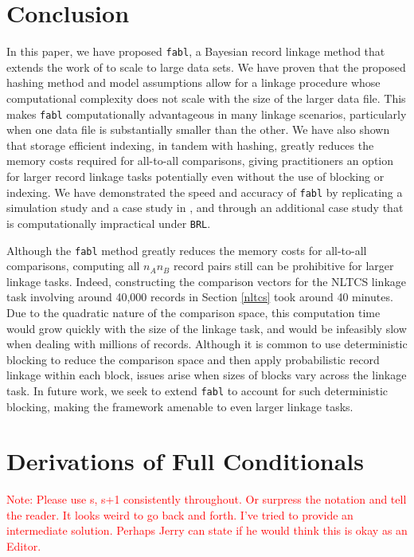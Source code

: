 \documentclass[ba]{imsart}
\begin{document}
	
	\section{Conclusion}
	\label{discussion}
	
	In this paper, we have proposed \texttt{fabl}, a Bayesian record linkage method that extends the work of \cite{sadinle_bayesian_2017} to scale to large data sets. We have proven that the proposed hashing method and model assumptions allow for a linkage procedure whose computational complexity does not scale with the size of the larger data file. This makes \texttt{fabl} computationally advantageous in many linkage scenarios, particularly when one data file is substantially smaller than the other. We have also shown that storage efficient indexing, in tandem with hashing, greatly reduces the memory costs required for all-to-all comparisons, giving practitioners an option for larger record linkage tasks potentially even without the use of blocking or indexing. We have demonstrated the speed and accuracy of \texttt{fabl} by replicating a simulation study and a case study in \cite{sadinle_bayesian_2017}, and through an additional case study that is computationally impractical under \texttt{BRL}. 
	
	Although the \texttt{fabl} method greatly reduces the memory costs for all-to-all comparisons, computing all $n_A  n_B$ record pairs still can be prohibitive for larger linkage tasks. Indeed, constructing the comparison vectors for the NLTCS linkage task involving around 40,000 records in Section \ref{nltcs} took around 40 minutes. Due to the quadratic nature of the comparison space, this computation time would grow quickly with the size of the linkage task, and would be infeasibly slow when dealing with millions of records. Although it is common to use deterministic blocking to reduce the comparison space and then apply probabilistic record linkage within each block, issues arise when sizes of blocks vary across the linkage task. In future work, we seek to extend \texttt{fabl} to account for such deterministic blocking, making the framework amenable to even larger linkage tasks.

	
	\clearpage
	
	\bigskip
	
	
	
	
	\clearpage
	

\appendix
	
		
	
	\hypertarget{app:derivations}{%
	\section{Derivations of Full Conditionals}\label{app:derivations}}
\textcolor{red}{Note: Please use s, s+1 consistently throughout. Or surpress the notation and tell the reader. It looks weird to go back and forth. I've tried to provide an intermediate solution. Perhaps Jerry can state if he would think this is okay as an Editor.}\\
\end{document}

